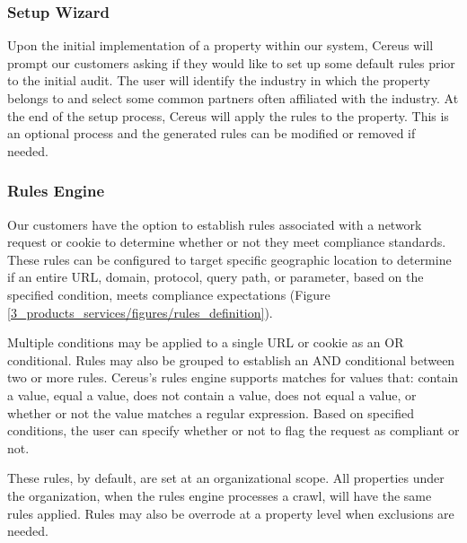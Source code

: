 
\subsubsection{Setup Wizard}

Upon the initial implementation of a property within our system, Cereus will prompt our customers asking if they would like to set up some default rules prior to the initial audit. The user will identify the industry in which the property belongs to and select some common partners often affiliated with the industry. At the end of the setup process, Cereus will apply the rules to the property. This is an optional process and the generated rules can be modified or removed if needed.

\subsubsection{Rules Engine}

Our customers have the option to establish rules associated with a network request or cookie to determine whether or not they meet compliance standards. These rules can be configured to target specific geographic location to determine if an entire URL, domain, protocol, query path, or parameter, based on the specified condition, meets compliance expectations (Figure \ref{3_products_services/figures/rules_definition}).

Multiple conditions may be applied to a single URL or cookie as an OR conditional. Rules may also be grouped to establish an AND conditional between two or more rules. Cereus's rules engine supports matches for values that: contain a value, equal a value, does not contain a value, does not equal a value, or whether or not the value matches a regular expression. Based on specified conditions, the user can specify whether or not to flag the request as compliant or not.


These rules, by default, are set at an organizational scope. All properties under the organization, when the rules engine processes a crawl, will have the same rules applied. Rules may also be overrode at a property level when exclusions are needed.


